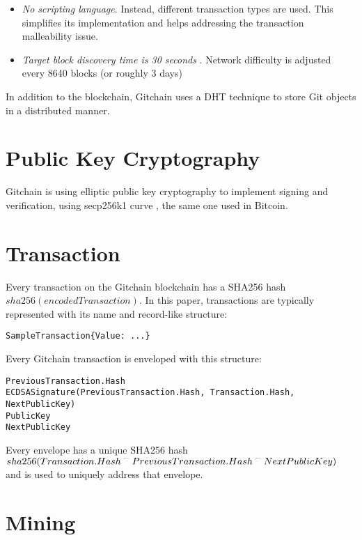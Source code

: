\documentclass[a4paper]{article}
\newcommand{\concatA}{%
  \mathbin{\raisebox{1ex}{\scalebox{.7}{$\frown$}}}%
}
\begin{document}
\begin{itemize}
\item \emph{No scripting language}. Instead, different transaction types are used. This simplifies its implementation and helps addressing the transaction malleability \cite{txnmal} issue.
\item \emph{Target block discovery time is 30 seconds }. Network difficulty is adjusted every 8640 blocks (or roughly 3 days) 
\end{itemize}

In addition to the blockchain, Gitchain uses a DHT technique to store Git objects in a distributed manner.

\section{Public Key Cryptography}

Gitchain is using elliptic public key cryptography to implement signing and verification, using secp256k1 curve , the same one used in
Bitcoin.

\section{Transaction}

Every transaction on the Gitchain blockchain has a SHA256 hash $sha256(encodedTransaction)$. In this paper, transactions are typically represented with its name and record-like structure:

\begin{verbatim}
SampleTransaction{Value: ...}
\end{verbatim}

Every Gitchain transaction is enveloped with this structure:

\begin{verbatim}
PreviousTransaction.Hash
ECDSASignature(PreviousTransaction.Hash, Transaction.Hash, NextPublicKey)
PublicKey
NextPublicKey
\end{verbatim}

Every envelope has a unique SHA256 hash $sha256(Transaction.Hash \concatA PreviousTransaction.Hash \concatA NextPublicKey)$ and is
used to uniquely address that envelope.


\section{Mining}
\end{document}
